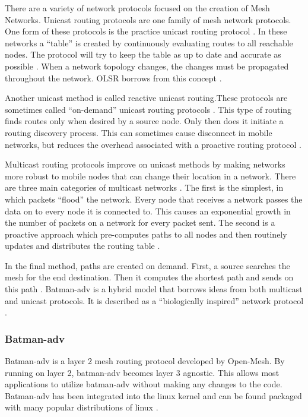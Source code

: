 There are a variety of network protocols focused on the creation of Mesh Networks. Unicast routing protocols are one family of mesh network protocols. One form of these protocols is the practice unicast routing protocol \cite{4796928}. In these networks a ``table'' is created by continuously evaluating routes to all reachable nodes. The protocol will try to keep the table as up to date and accurate as possible \cite{4796928}. When a network topology changes, the changes must be propagated throughout the network. OLSR borrows from this concept \cite{0033} \cite{5375690}. 

Another unicast method is called reactive unicast routing.These protocols are sometimes called ``on-demand'' unicast routing protocols \cite{4796928}. This type of routing finds routes only when desired by a source node. Only then does it initiate a routing discovery process. This can sometimes cause disconnect in mobile networks, but reduces the overhead associated with a proactive routing protocol \cite{0033}.

Multicast routing protocols improve on unicast methods by making networks more robust to mobile nodes that can change their location in a network. There are three main categories of multicast networks \cite{4796928}. The first is the simplest, in which packets ``flood'' the network. Every node that receives a network passes the data on to every node it is connected to. This causes an exponential growth in the number of packets on a network for every packet sent. The second is a proactive approach which pre-computes paths to all nodes and then routinely updates and distributes the routing table \cite{4796928}.

In the final method, paths are created on demand. First, a source searches the mesh for the end destination. Then it computes the shortest path and sends on this path \cite{4796928}. Batman-adv is a hybrid model that borrows ideas from both multicast and unicast protocols. It is described as a ``biologically inspired'' network protocol \cite{0033}.  

\subsubsection{Batman-adv}

Batman-adv is a layer 2 mesh routing protocol developed by Open-Mesh. By running on layer 2, batman-adv becomes layer 3 agnostic. This allows most applications to utilize batman-adv without making any changes to the code. Batman-adv has been integrated into the linux kernel and can be found packaged with many popular distributions of linux \cite{5375690}. 


